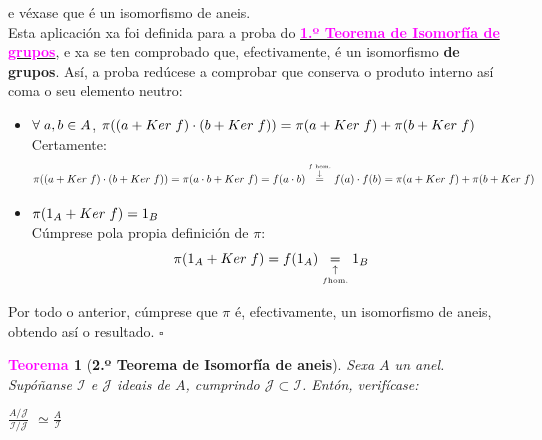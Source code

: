 \documentclass[twoside]{report}
\newcommand{\magbf}[1]{\textcolor{magenta}{\textbf{#1}}} %
\theoremstyle{mystyle}
\newtheorem{theo}{\magbf{Teorema}}[chapter]
\newenvironment{theorem}
{\begin{mdframed}[linecolor = magenta,backgroundcolor = classicrose, linewidth = 2mm]\begin{theo}}
{\end{theo}\end{mdframed}}
\begin{document}
\noindent e véxase que é un isomorfismo de aneis.\\

\noindent Esta aplicación xa foi definida para a proba do \hyperref[th1.5]{\magbf{1.º Teorema de Isomorfía de grupos}}, e xa se ten comprobado que, efectivamente, é un isomorfismo \textbf{de grupos}. Así, a proba redúcese a comprobar que conserva o produto interno así coma o seu elemento neutro:

\begin{itemize}
    
    \item $\forall \hspace{1mm} a,b \in A$, $\pi((a + Ker \hspace{1mm} f) \cdot (b + Ker \hspace{1mm} f)) = \pi(a + Ker \hspace{1mm} f) + \pi(b + Ker \hspace{1mm} f)$\\
    
    Certamente:
    $$\pi((a + Ker \hspace{1mm} f) \cdot (b + Ker \hspace{1mm} f)) = \pi(a \cdot b + Ker \hspace{1mm} f) = f(a \cdot b) \overset{\overset{f \text{ hom.}}{\downarrow}}{=} f(a) \cdot f(b) = \pi(a + Ker \hspace{1mm} f) + \pi(b + Ker \hspace{1mm} f)$$
    
    \item $\pi(1_{A} + Ker \hspace{1mm} f) = 1_{B}$\\
    
    Cúmprese pola propia definición de $\pi$: $$\pi(1_{A} + Ker \hspace{1mm} f) = f(1_{A}) \underset{\underset{f \text{hom.}}{\uparrow}}{=} 1_{B}$$
    
\end{itemize}

\noindent Por todo o anterior, cúmprese que $\pi$ é, efectivamente, un isomorfismo de aneis, obtendo así o resultado. $\square$ \pagebreak

\vspace{3mm}

\begin{theorem}[\textbf{2.º Teorema de Isomorfía de aneis}] \label{th2.2}
Sexa $A$ un anel. Supóñanse $\mathcal{I}$ e $\mathcal{J}$ ideais de $A$, cumprindo $\mathcal{J} \subset \mathcal{I}$. Entón, verifícase:
\begin{center}
    $\displaystyle \frac{A/\mathcal{J}}{\mathcal{I}/\mathcal{J}}$ $\simeq \displaystyle \frac{A}{\mathcal{I}}$
\end{center}
\end{theorem}
\end{document}

